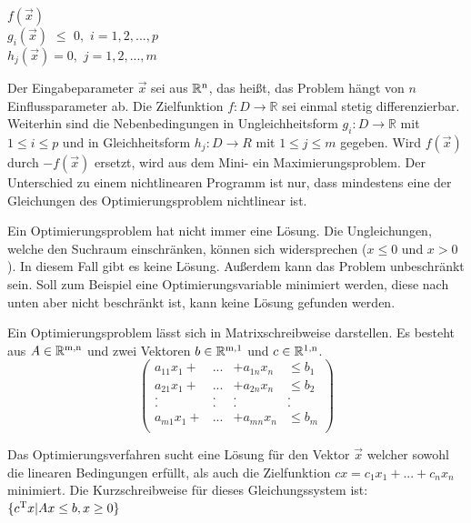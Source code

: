\documentclass{like}
\begin{document}
\noindent\hspace*{3mm}%
$f(\vec{x}) $ \\
\noindent\hspace*{3mm}%
$g_i(\vec{x})$ $\leq$ $0,$ $i=1,2,...,p$  \\
\noindent\hspace*{22mm}%
$h_j(\vec{x})= 0,$ $j= 1,2,...,m$\\ 
\noindent\hspace*{22mm}%


Der Eingabeparameter $\vec{x}$ sei aus $\mathbb{R} \textsuperscript{n} $, das heißt, das Problem hängt von \(n\) Einflussparameter ab. Die Zielfunktion $f:D \rightarrow \mathbb{R} $ sei einmal stetig differenzierbar. Weiterhin sind die Nebenbedingungen in Ungleichheitsform $g_i:D \rightarrow \mathbb{R}$ mit $1\leq i \leq p$ und in Gleichheitsform $h_j:D \rightarrow \!R$ mit $1\leq j \leq m$ gegeben.
Wird \(f(\vec{x})\) durch \(-f(\vec{x})\) ersetzt, wird aus dem Mini- ein Maximierungsproblem. Der Unterschied zu einem nichtlinearen Programm ist nur, dass mindestens eine der Gleichungen des Optimierungsproblem nichtlinear ist.

Ein Optimierungsproblem hat nicht immer eine Lösung. Die Ungleichungen, welche den Suchraum einschränken, können sich widersprechen ($x \leq 0 $ und $x > 0$). In diesem Fall gibt es keine Lösung. Außerdem kann das Problem unbeschränkt sein. Soll zum Beispiel eine Optimierungsvariable minimiert werden, diese nach unten aber nicht beschränkt ist, kann keine Lösung gefunden werden. 

Ein Optimierungsproblem lässt sich in Matrixschreibweise darstellen. Es besteht aus $A \in \mathbb{R} \textsuperscript{m,n}$ und zwei Vektoren $b \in \mathbb{R} \textsuperscript{m,1}$ und $c \in \mathbb{R} \textsuperscript{1,n}$. \\

\[ \left( \begin{array}{cccc}
a_{11} x_1 + & ... & + a_{1n} x_n & \leq b_1 \\   	
a_{21} x_1 + & ... & + a_{2n} x_n & \leq b_2 \\ 
. & . & . & . \\
. & . & . & . \\
a_{m1} x_1 + & ... & + a_{mn} x_n & \leq b_m \\
\end{array} \right)\] 

Das Optimierungsverfahren sucht eine Lösung für den Vektor \(\vec{x}\) welcher sowohl die linearen Bedingungen erfüllt, als auch die Zielfunktion 
$cx=c_1 x_1 + ... + c_n x_n$ minimiert.
Die Kurzschreibweise für dieses Gleichungssystem ist: \\
 $\{ c\textsuperscript{T}x | Ax \leq b, x \geq 0 \}$
\end{document}
